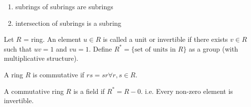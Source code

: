 \begin{proposition}
    \begin{enumerate}
        \item subrings of subrings are subrings
        \item intersection of subrings is a subring
    \end{enumerate}
\end{proposition}

\begin{prop-defn}[Units]
Let \(R\) = ring. An element \(u \in R\) is called a unit or invertible if there exists \(v \in R\) such that \(uv = 1\) and \(vu = 1\). Define \(R^* = \{\text{set of units in } R\}\) as a group (with multiplicative structure).
\end{prop-defn}


\begin{definition}
    A ring \(R\) is commutative if \(rs = sr \forall r,s \in R\).
\end{definition}

\begin{definition}[Fields]
    A commutative ring \(R\) is a field if \(R^* = R - 0\). i.e. Every non-zero element is invertible.
\end{definition}